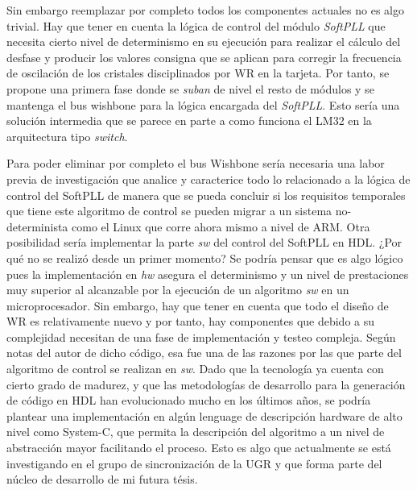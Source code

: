 Sin embargo reemplazar por completo todos los componentes actuales no es algo 
trivial. Hay que tener en cuenta la lógica de control del módulo 
\textit{SoftPLL} que necesita cierto nivel de determinismo en su ejecución para 
realizar el cálculo del desfase y producir los valores consigna que se aplican 
para corregir la frecuencia de oscilación de los cristales disciplinados por WR 
en la tarjeta. Por tanto, se propone una primera fase donde se \textit{suban} 
de nivel el resto de módulos y se mantenga el bus wishbone para la lógica 
encargada del \textit{SoftPLL}. Esto sería una solución intermedia que se 
parece en parte a como funciona el LM32 en la arquitectura tipo \textit{switch}.

Para poder eliminar por completo el bus Wishbone sería necesaria una labor 
previa de investigación que analice y caracterice todo lo relacionado a la 
lógica de control del SoftPLL de manera que se pueda concluir si los requisitos 
temporales que tiene este algoritmo de control se pueden migrar a un sistema 
no-determinista como el Linux que corre ahora mismo a nivel de ARM. Otra 
posibilidad sería implementar la parte \textit{sw} del control del SoftPLL en 
HDL. ¿Por qué no se realizó desde un primer momento? Se podría pensar que es 
algo lógico pues la implementación en \textit{hw} asegura el determinismo y un 
nivel de prestaciones muy superior al alcanzable por la ejecución de un 
algoritmo \textit{sw} en un microprocesador. Sin embargo, hay que tener en 
cuenta que todo el diseño de WR es relativamente nuevo y por tanto, hay 
componentes que debido a su complejidad necesitan de una fase de implementación 
y testeo compleja. Según notas del autor de dicho código, esa fue una de las 
razones por las que parte del algoritmo de 
control se realizan en \textit{sw}. Dado que la tecnología ya cuenta con cierto 
grado de madurez, y que las metodologías de desarrollo para la generación de 
código en HDL han evolucionado mucho en los últimos años, se podría plantear 
una implementación en algún lenguage de descripción hardware de alto nivel como 
System-C, que permita la descripción del algoritmo a un nivel de abstracción 
mayor facilitando el proceso. Esto es algo que actualmente se está investigando 
en el grupo de sincronización de la UGR y que forma parte del núcleo de 
desarrollo de mi futura tésis.

